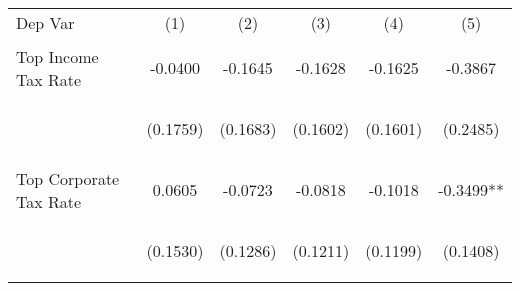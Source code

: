 \begin{center}
\begin{tabular}{lccccc}
\hline \noalign{\smallskip}Dep Var & (1) & (2) & (3) & (4) & (5)\\
\noalign{\smallskip}\hline \noalign{\smallskip}Top Income Tax Rate & \begin{scriptsize}-0.0400\end{scriptsize} & \begin{scriptsize}-0.1645\end{scriptsize} & \begin{scriptsize}-0.1628\end{scriptsize} & \begin{scriptsize}-0.1625\end{scriptsize} & \begin{scriptsize}-0.3867\end{scriptsize}\\
 & \begin{scriptsize}(0.1759)\end{scriptsize} & \begin{scriptsize}(0.1683)\end{scriptsize} & \begin{scriptsize}(0.1602)\end{scriptsize} & \begin{scriptsize}(0.1601)\end{scriptsize} & \begin{scriptsize}(0.2485)\end{scriptsize}\\
\noalign{\smallskip}Top Corporate Tax Rate & \begin{scriptsize}0.0605\end{scriptsize} & \begin{scriptsize}-0.0723\end{scriptsize} & \begin{scriptsize}-0.0818\end{scriptsize} & \begin{scriptsize}-0.1018\end{scriptsize} & \begin{scriptsize}-0.3499**\end{scriptsize}\\
 & \begin{scriptsize}(0.1530)\end{scriptsize} & \begin{scriptsize}(0.1286)\end{scriptsize} & \begin{scriptsize}(0.1211)\end{scriptsize} & \begin{scriptsize}(0.1199)\end{scriptsize} & \begin{scriptsize}(0.1408)\end{scriptsize}\\

\end{tabular}
\end{center}

